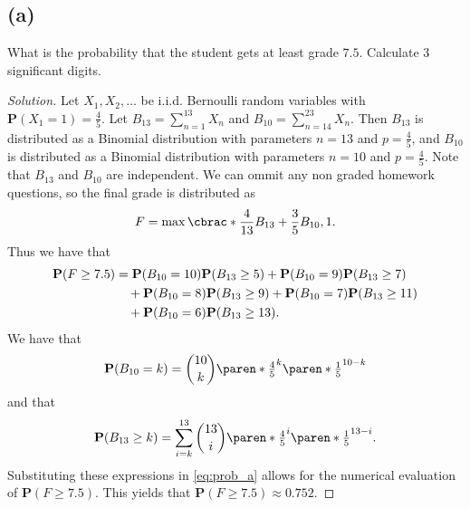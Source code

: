 \documentclass[10pt, a4paper, twoside]{amsart}
\DeclarePairedDelimiter\cbrac\{\}
\DeclarePairedDelimiter\paren()
\renewcommand{\P}{\ensuremath{\mathbf{P}}}
\newenvironment{solution}
               {\let\oldqedsymbol=\qedsymbol
                \renewcommand{\qedsymbol}{$\blacktriangleleft$}
                \begin{proof}[Solution]}
               {\end{proof}
                \renewcommand{\qedsymbol}{\oldqedsymbol}}
\begin{document}
\subsection*{(a)}
What is the probability that the student gets at least grade $7.5$.
Calculate $3$ significant digits.
\begin{solution}
Let $X_1,X_2,\ldots$ be i.i.d. Bernoulli random variables with $\P(X_1=1)=\tfrac{4}{5}$.
Let $B_{13}=\sum_{n=1}^{13}X_n$ and $B_{10}=\sum_{n=14}^{23} X_n$.
Then $B_{13}$ is distributed as a Binomial distribution with parameters $n=13$ and $p=\tfrac{4}{5}$,
and $B_{10}$ is distributed as a Binomial distribution with parameters $n=10$ and $p=\tfrac{4}{5}$.
Note that $B_{13}$ and $B_{10}$ are independent.
We can ommit any non graded homework questions, so the final grade is distributed as 
\begin{equation*}
F=\max\cbrac*{\frac{4}{13}B_{13}+\frac{3}{5} B_{10},1}. 
\end{equation*}
Thus we have that 
\begin{equation}\label{eq:prob_a}
\begin{aligned}
  \P(F \geq 7.5)&=\P(B_{10} = 10)\P(B_{13} \geq 5)+\P(B_{10} = 9)\P(B_{13} \geq 7) \\
 & \hspace{1 em} +\P(B_{10} = 8)\P(B_{13} \geq 9)+\P(B_{10} = 7)\P(B_{13} \geq 11) \\
 & \hspace{1 em} +\P(B_{10} = 6)\P(B_{13} \geq 13).
 \end{aligned}
\end{equation}
We have that 
\begin{equation*}
\P(B_{10} = k)=\binom{10}{k}\paren*{\tfrac{4}{5}}^{k}\paren*{\tfrac{1}{5}}^{10-k} 
\end{equation*}
and that 
\begin{equation*}
\P(B_{13} \geq k)=\sum_{i=k}^{13}\binom{13}{i}\paren*{\tfrac{4}{5}}^{i}\paren*{\tfrac{1}{5}}^{13-i}. 
\end{equation*}
Substituting these expressions in \cref{eq:prob_a} allows for the numerical evaluation of $\P(F \geq 7.5)$.
This yields that $\P(F \geq 7.5)\approx 0.752$.
\end{solution}
\end{document}

